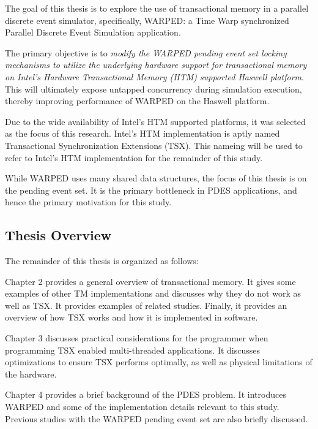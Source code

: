 \documentclass[a4paper]{article}
\begin{document}
\indent 
The goal of this thesis is to explore the use of transactional memory in
a parallel discrete event simulator, specifically, WARPED: a Time
Warp synchronized Parallel Discrete Event Simulation application.
\par

\indent
The primary objective is to \textit{modify the WARPED pending event set
    locking mechanisms to utilize the underlying hardware support for
    transactional memory on Intel's Hardware Transactional Memory (HTM)
supported Haswell platform}.  This will ultimately expose untapped concurrency
during simulation execution, thereby improving performance of WARPED on the
Haswell platform.
\par

\indent
Due to the wide availability of Intel's HTM supported platforms, it was
selected as the focus of this research.  Intel's HTM implementation is aptly
named Transactional Synchronization Extensions (TSX).  This nameing will be used
to refer to Intel's HTM implementation for the remainder of this study.
\par

\indent 
While WARPED uses many shared data structures, the focus of this thesis
is on the pending event set.  It is the primary bottleneck in PDES applications,
and hence the primary motivation for this study.
\par

\subsection{\textbf{Thesis Overview}}

The remainder of this thesis is organized as follows:
\par

\indent 
Chapter 2 provides a general overview of transactional memory.  It gives
some examples of other TM implementations and discusses why they do not work as
well as TSX.  It provides examples of related studies.  Finally, it provides an
overview of how TSX works and how it is implemented in software.
\par

\indent
Chapter 3 discusses practical considerations for the programmer when programming
TSX enabled multi-threaded applications.  It discusses optimizations to ensure
TSX performs optimally, as well as physical limitations of the hardware.
\par

\indent
Chapter 4 provides a brief background of the PDES problem.  It introduces
WARPED and some of the implementation details relevant to this study. Previous
studies with the WARPED pending event set are also briefly discussed.
\par
\end{document}
